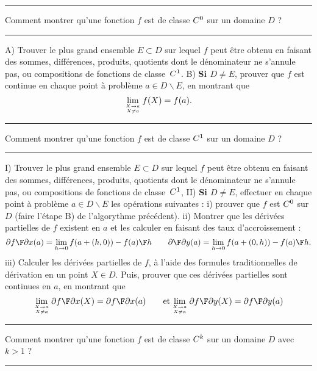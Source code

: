 
\vglue-10mm%
\bigskip

\hrule
\centerline{Comment montrer qu'une fonction $f$ est de classe $\sc C^0$ sur un domaine $D$ ?}
\hrule
\bigskip
\noindent
A) Trouver le plus grand ensemble $E\subset D$ sur lequel $f$ peut \^etre obtenu en faisant des sommes, diff\'erences, produits, quotients dont le d\'enominateur ne s'annule pas, ou compositions de fonctions de classe~$\sc C^1$. 
\medskip
\noindent
B) {\bf Si $D\neq E$}, prouver que $f$ est continue en chaque point \`a probl\`eme $a\in D\smallsetminus E$, en montrant que  
$$
\lim_{X\to a\atop X\neq a}f(X)=f(a).
$$

\hrule
\centerline{Comment montrer qu'une fonction $f$ est de classe $\sc C^1$ sur un domaine $D$ ?}
\hrule

\bigskip\noindent
I) Trouver le plus grand ensemble $E\subset D$ sur lequel $f$ peut \^etre obtenu en faisant des sommes, diff\'erences, produits, quotients dont le d\'enominateur ne s'annule pas, ou compositions de fonctions de classe~$\sc C^1$, 
\medskip\noindent
II) {\bf Si $D\neq E$}, effectuer en chaque point \`a probl\`eme $a\in D\smallsetminus E$ les op\'erations suivantes : \pn
i) prouver que $f$ est $\sc C^0$ sur $D$ (faire l'\'etape B) de l'algorythme pr\'ec\'edent). \pn
ii) Montrer que les d\'eriv\'ees partielles de $f$ existent en $a$ et les calculer en faisant des taux d'accroissement :
$$
{\partial f\F\partial x}(a)=\lim_{h\to 0}{f(a+(h,0))-f(a)\F h}\qquad {\partial\F\partial y}(a)=\lim_{h\to 0}{f(a+(0,h))-f(a)\F h}. 
$$
iii) Calculer les d\'eriv\'ees partielles de $f$, \`a l'aide des formules traditionnelles de d\'erivation en un point $X\in D$. 
Puis, prouver que ces d\'eriv\'ees partielles sont continues en $a$, en montrant que  
$$
\lim_{X\to a\atop X\neq a}{\partial f\F\partial x}(X)={\partial f\F\partial x}(a)\qquad \hbox{et} \lim_{X\to a\atop X\neq a}{\partial f\F\partial y}(X)={\partial f\F\partial y}(a)
$$

\hrule
\centerline{Comment montrer qu'une fonction $f$ est de classe $\sc C^k$ sur un domaine $D$ avec $k>1$ ?}
\hrule

